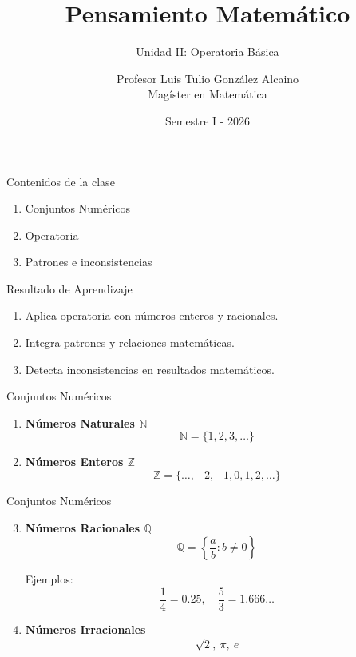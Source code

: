 \documentclass{beamer}
\title{Pensamiento Matemático}
\subtitle{Unidad II: Operatoria Básica}
\author{Profesor Luis Tulio González Alcaino \\ Magíster en Matemática}
\institute{Universidad Santo Tomás \\ Departamento Ciencias Básicas - Talca}
\date{Semestre I - 2026}
\begin{document}
	
	\begin{frame}
		\titlepage
	\end{frame}
	
	\begin{frame}{Contenidos de la clase}
		\begin{enumerate}
			\item Conjuntos Numéricos
			\item Operatoria
			\item Patrones e inconsistencias
		\end{enumerate}
	\end{frame}
	
	\begin{frame}{Resultado de Aprendizaje}
		\begin{enumerate}
			\item Aplica operatoria con números enteros y racionales.
			\item Integra patrones y relaciones matemáticas.
			\item Detecta inconsistencias en resultados matemáticos.
		\end{enumerate}
	\end{frame}
	
	\begin{frame}{Conjuntos Numéricos}
		\begin{enumerate}
			\item \textbf{Números Naturales \(\mathbb{N}\)}
			\[
			\mathbb{N}=\{1,2,3,\dots\}
			\]
			
			\pause
			
			\item \textbf{Números Enteros \(\mathbb{Z}\)}
			\[
			\mathbb{Z}=\{\dots,-2,-1,0,1,2,\dots\}
			\]
		\end{enumerate}
	\end{frame}
	
	\begin{frame}{Conjuntos Numéricos}
		\begin{enumerate}
			\setcounter{enumi}{2}
			
			\item \textbf{Números Racionales \(\mathbb{Q}\)}
			\[
			\mathbb{Q}=\left\{\frac{a}{b}: b\neq0\right\}
			\]
			
			Ejemplos:
			\[
			\frac{1}{4}=0.25,\quad \frac{5}{3}=1.666\ldots
			\]
			
			\pause
			
			\item \textbf{Números Irracionales}
			\[
			\sqrt{2},\ \pi,\ e
			\]
		\end{enumerate}
	\end{frame}
	
\end{document}
